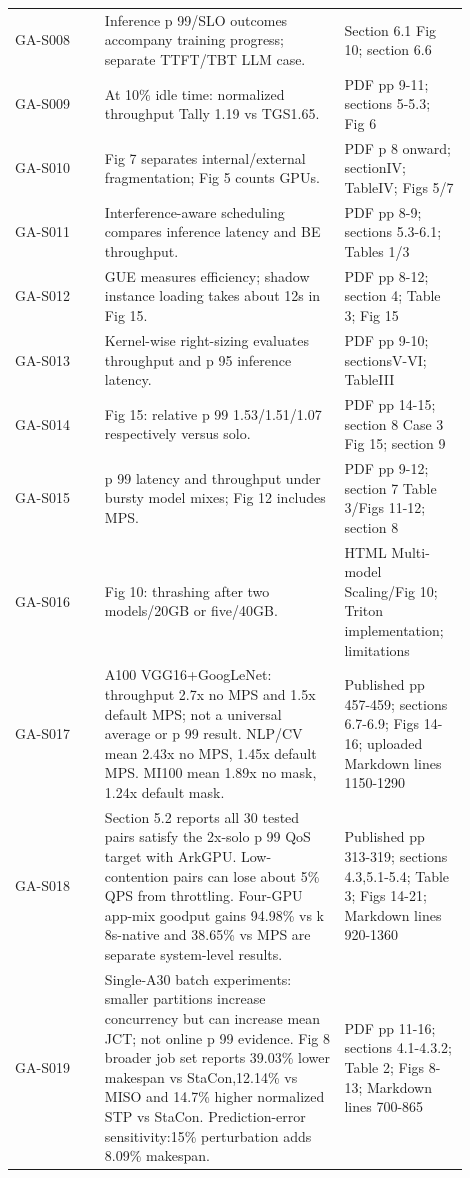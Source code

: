 \documentclass[12pt,a4paper]{article}
\begin{document}
\begin{longtable}{P{0.18\linewidth}P{0.48\linewidth}P{0.24\linewidth}}
GA-S008 \cite{sirius} & Inference p 99/SLO outcomes accompany training progress; separate TTFT/TBT LLM case. & Section 6.1 Fig 10; section 6.6\\
GA-S009 \cite{tally} & At 10\% idle time: normalized throughput Tally 1.19 vs TGS1.65. & PDF pp 9-11; sections 5-5.3; Fig 6\\
GA-S010 \cite{parva} & Fig 7 separates internal/external fragmentation; Fig 5 counts GPUs. & PDF p 8 onward; sectionIV; TableIV; Figs 5/7\\
GA-S011 \cite{orion} & Interference-aware scheduling compares inference latency and BE throughput. & PDF pp 8-9; sections 5.3-6.1; Tables 1/3\\
GA-S012 \cite{gslice} & GUE measures efficiency; shadow instance loading takes about 12s in Fig 15. & PDF pp 8-12; section 4; Table 3; Fig 15\\
GA-S013 \cite{krisp} & Kernel-wise right-sizing evaluates throughput and p 95 inference latency. & PDF pp 9-10; sectionsV-VI; TableIII\\
GA-S014 \cite{xsched} & Fig 15: relative p 99 1.53/1.51/1.07 respectively versus solo. & PDF pp 14-15; section 8 Case 3 Fig 15; section 9\\
GA-S015 \cite{paella} & p 99 latency and throughput under bursty model mixes; Fig 12 includes MPS. & PDF pp 9-12; section 7 Table 3/Figs 11-12; section 8\\
GA-S016 \cite{gnntriton} & Fig 10: thrashing after two models/20GB or five/40GB. & HTML Multi-model Scaling/Fig 10; Triton implementation; limitations\\
GA-S017 \cite{vastpipe} & A100 VGG16+GoogLeNet: throughput 2.7x no MPS and 1.5x default MPS; not a universal average or p 99 result. NLP/CV mean 2.43x no MPS, 1.45x default MPS. MI100 mean 1.89x no mask, 1.24x default mask. & Published pp 457-459; sections 6.7-6.9; Figs 14-16; uploaded Markdown lines 1150-1290\\
GA-S018 \cite{arkgpu} & Section 5.2 reports all 30 tested pairs satisfy the 2x-solo p 99 QoS target with ArkGPU. Low-contention pairs can lose about 5\% QPS from throttling. Four-GPU app-mix goodput gains 94.98\% vs k 8s-native and 38.65\% vs MPS are separate system-level results. & Published pp 313-319; sections 4.3,5.1-5.4; Table 3; Figs 14-21; Markdown lines 920-1360\\
GA-S019 \cite{dynap} & Single-A30 batch experiments: smaller partitions increase concurrency but can increase mean JCT; not online p 99 evidence. Fig 8 broader job set reports 39.03\% lower makespan vs StaCon,12.14\% vs MISO and 14.7\% higher normalized STP vs StaCon. Prediction-error sensitivity:15\% perturbation adds 8.09\% makespan. & PDF pp 11-16; sections 4.1-4.3.2; Table 2; Figs 8-13; Markdown lines 700-865\\

\end{longtable}
\end{document}
